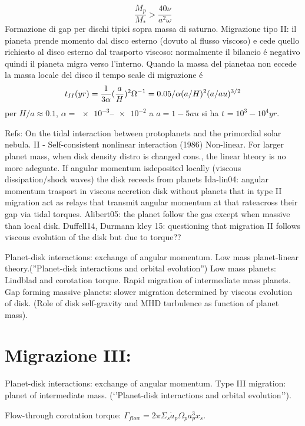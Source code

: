 \begin{workout}
\begin{equation}
\frac{M_p}{M_*}>\frac{40\nu}{a^2\omega}
\end{equation}
Formazione di gap per dischi tipici sopra massa di saturno.
Migrazione tipo II: il pianeta prende momento dal disco esterno (dovuto al flusso viscoso) e cede quello richiesto al disco esterno dal trasporto viscoso: normalmente il bilancio \'e negativo quindi il pianeta migra verso l'interno.
Quando la massa del pianetaa non eccede la massa locale del disco il tempo scale di migrazione \'e
\begin{equation}
t_{II}(yr)=\frac{1}{3\alpha}(\frac{a}{H})^2\Omega^{-1}=0.05/\alpha(a/H)^2(a/au)^{3/2}
\end{equation}
per $H/a\approx0.1$, $\alpha=\numrange{e-3}{e-2}$ a $a=1-5 au$ si ha $t_{}=10^3-10^4yr$.
\end{workout}

Refs: On the tidal interaction between protoplanets and the primordial solar nebula. II - Self-consistent nonlinear interaction (1986)
Non-linear. For larger planet mass, when disk density distro is changed cons., the linear hteory is no more adeguate. If angular momentum isdeposited locally (viscous dissipation/shock waves)  the disk receeds from planets
Ida-lin04: angular momentum trasport in viscous accretion disk without planets that in type II migration act as relays that transmit angular momentum at that rateacross their gap via tidal torques.
Alibert05: the planet follow the gas except when massive than local disk.
Duffell14, Durmann kley 15: questioning that migration II follows viscous evolution of the disk but due to torque??


Planet-disk interactions: exchange of angular momentum. Low mass planet-linear theory.(''Planet-disk interactions and orbital evolution'')
Low mass planets: Lindblad and corotation torque. Rapid migration of intermediate mass planets. Gap forming massive planets: slower migration determined by viscous evolution of disk. (Role of disk self-gravity and MHD turbulence as function of planet mass).


\section{Migrazione III:}
Planet-disk interactions: exchange of angular momentum. Type III migration: planet of intermediate mass. (‘’Planet-disk interactions and orbital evolution’’).

Flow-through corotation torque: $\Gamma_{flow}=2\pi\Sigma_s\dot{a}_p\Omega_pa_p^3x_s$.

